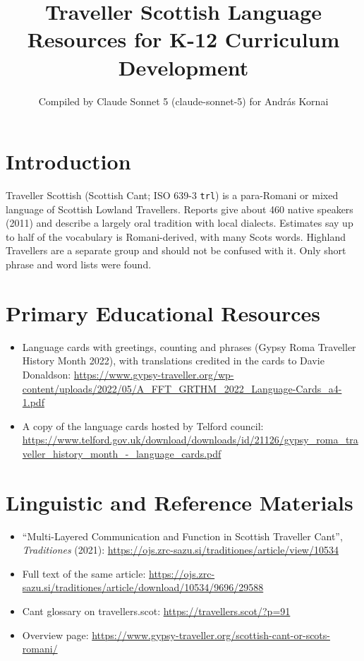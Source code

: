 \documentclass[12pt]{article}
\title{Traveller Scottish Language Resources for K-12 Curriculum Development}
\author{Compiled by Claude Sonnet 5 (claude-sonnet-5) for Andr\'as Kornai}
\date{}
\begin{document}
\maketitle

\section{Introduction}
Traveller Scottish (Scottish Cant; ISO 639-3 \texttt{trl}) is a para-Romani or mixed language of Scottish Lowland Travellers. Reports give about 460 native speakers (2011) and describe a largely oral tradition with local dialects. Estimates say up to half of the vocabulary is Romani-derived, with many Scots words. Highland Travellers are a separate group and should not be confused with it. Only short phrase and word lists were found.

\section{Primary Educational Resources}
\begin{itemize}
\item Language cards with greetings, counting and phrases (Gypsy Roma Traveller History Month 2022), with translations credited in the cards to Davie Donaldson: \url{https://www.gypsy-traveller.org/wp-content/uploads/2022/05/A_FFT_GRTHM_2022_Language-Cards_a4-1.pdf}
\item A copy of the language cards hosted by Telford council: \url{https://www.telford.gov.uk/download/downloads/id/21126/gypsy_roma_traveller_history_month_-_language_cards.pdf}
\end{itemize}

\section{Linguistic and Reference Materials}
\begin{itemize}
\item ``Multi-Layered Communication and Function in Scottish Traveller Cant'', \emph{Traditiones} (2021): \url{https://ojs.zrc-sazu.si/traditiones/article/view/10534}
\item Full text of the same article: \url{https://ojs.zrc-sazu.si/traditiones/article/download/10534/9696/29588}
\item Cant glossary on travellers.scot: \url{https://travellers.scot/?p=91}
\item Overview page: \url{https://www.gypsy-traveller.org/scottish-cant-or-scots-romani/}
\end{itemize}
\end{document}
